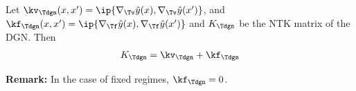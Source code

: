 \begin{proposition}\label{prop:ntks} Let $\kv_{\Tdgn}(x,x')=\ip{ \nabla_{\Tv}\hat{y}(x), \nabla_{\Tv}\hat{y}(x')}$, and  $\kf_{\Tdgn}(x,x')=\ip{ \nabla_{\Tf}\hat{y}(x), \nabla_{\Tf}\hat{y}(x') }$ and $K_{\Tdgn}$ be the NTK matrix of the DGN. Then 
\begin{align*}
K_{\Tdgn}=\kv_{\Tdgn}+\kf_{\Tdgn}
\end{align*}

\end{proposition}
\textbf{Remark:} In the case of fixed regimes, $\kf_{\Tdgn}=0$. 

